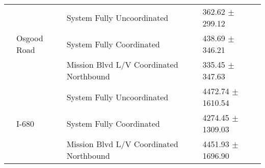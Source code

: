 \begin{tabular}{llll}
 & \multirow[t]{3}{*}{Osgood Road} & System Fully Uncoordinated & 362.62 $\pm$ 299.12 \\
 &  & System Fully Coordinated & 438.69 $\pm$ 346.21 \\
 &  & Mission Blvd L/V Coordinated Northbound & 335.45 $\pm$ 347.63 \\
 & \multirow[t]{3}{*}{I-680} & System Fully Uncoordinated & 4472.74 $\pm$ 1610.54 \\
 &  & System Fully Coordinated & 4274.45 $\pm$ 1309.03 \\
 &  & Mission Blvd L/V Coordinated Northbound & 4451.93 $\pm$ 1696.90 \\
\bottomrule
\end{tabular}
